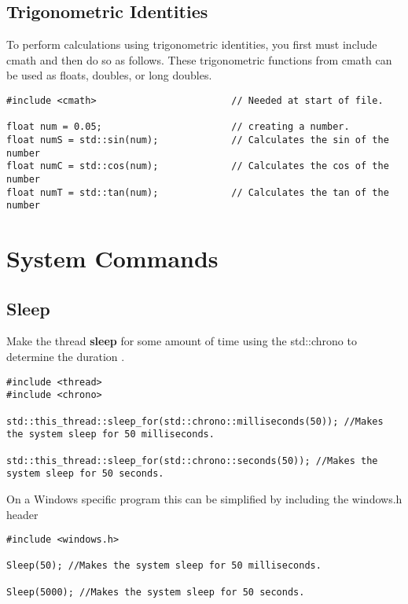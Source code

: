 \subsection*{Trigonometric Identities}
To perform calculations using trigonometric identities, you first must include cmath and then do so as follows. These trigonometric functions from cmath can be used as floats, doubles, or long doubles.
\begin{lstlisting}
#include <cmath>                        // Needed at start of file.

float num = 0.05;                       // creating a number.
float numS = std::sin(num);             // Calculates the sin of the number
float numC = std::cos(num);             // Calculates the cos of the number
float numT = std::tan(num);             // Calculates the tan of the number
\end{lstlisting}













\section{System Commands}

\subsection*{Sleep}
Make the thread \textbf{sleep} for some amount of time using the std::chrono to determine the duration \cite{cpp:chrono}.
\begin{lstlisting}
#include <thread>
#include <chrono>

std::this_thread::sleep_for(std::chrono::milliseconds(50)); //Makes the system sleep for 50 milliseconds.

std::this_thread::sleep_for(std::chrono::seconds(50)); //Makes the system sleep for 50 seconds.
\end{lstlisting}

On a Windows specific program this can be simplified by including the windows.h header
\begin{lstlisting}
#include <windows.h>

Sleep(50); //Makes the system sleep for 50 milliseconds.

Sleep(5000); //Makes the system sleep for 50 seconds.
\end{lstlisting}


